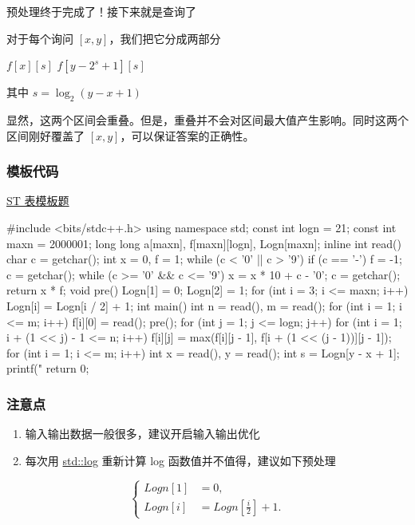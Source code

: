 预处理终于完成了！接下来就是查询了

对于每个询问 $[x,y]$，我们把它分成两部分

$f[x][s]$  $f[y-2^s+1][s]$

其中 $s=\log_2{(y-x+1)}$

显然，这两个区间会重叠。但是，重叠并不会对区间最大值产生影响。同时这两个区间刚好覆盖了 $[x,y]$，可以保证答案的正确性。

\subsubsection{模板代码}

\href{https://www.luogu.org/problemnew/show/P3865}{ST 表模板题}

\begin{cppcode}
#include <bits/stdc++.h>
using namespace std;
const int logn = 21;
const int maxn = 2000001;
long long a[maxn], f[maxn][logn], Logn[maxn];
inline int read() {
  char c = getchar();
  int x = 0, f = 1;
  while (c < '0' || c > '9') {
    if (c == '-') f = -1;
    c = getchar();
  }
  while (c >= '0' && c <= '9') {
    x = x * 10 + c - '0';
    c = getchar();
  }
  return x * f;
}
void pre() {
  Logn[1] = 0;
  Logn[2] = 1;
  for (int i = 3; i <= maxn; i++) {
    Logn[i] = Logn[i / 2] + 1;
  }
}
int main() {
  int n = read(), m = read();
  for (int i = 1; i <= m; i++) f[i][0] = read();
  pre();
  for (int j = 1; j <= logn; j++)
    for (int i = 1; i + (1 << j) - 1 <= n; i++)
      f[i][j] = max(f[i][j - 1], f[i + (1 << (j - 1))][j - 1]);
  for (int i = 1; i <= m; i++) {
    int x = read(), y = read();
    int s = Logn[y - x + 1];
    printf("%
  }
  return 0;
}
\end{cppcode}

\subsubsection{注意点}

\begin{enumerate}
\item 输入输出数据一般很多，建议开启输入输出优化
\item 每次用 \href{https://en.cppreference.com/w/cpp/numeric/math/log}{std::log} 重新计算 log 函数值并不值得，建议如下预处理
\end{enumerate}

$$
\left\{\begin{aligned}
Logn[1] &=0, \\
Logn\left[i\right] &=Logn[\frac{i}{2}] + 1.
\end{aligned}\right.
$$

